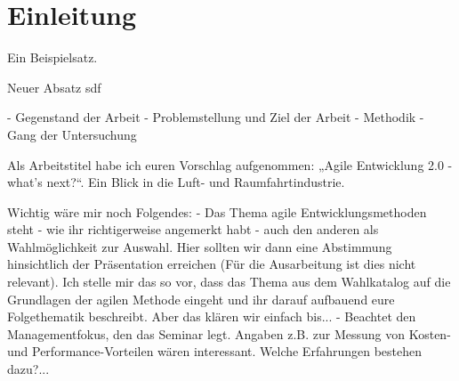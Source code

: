 \chapter{Einleitung}

Ein Beispielsatz. \parencite[Vgl.][S. 20]{Thompson:1984:RTT:358198.358210}

Neuer Absatz sdf


- Gegenstand der Arbeit
- Problemstellung und Ziel der Arbeit 
- Methodik
- Gang der Untersuchung

Als Arbeitstitel habe ich euren Vorschlag aufgenommen: „Agile Entwicklung 2.0 - what's next?“. Ein Blick in die Luft- und Raumfahrtindustrie.

Wichtig wäre mir noch Folgendes: 
- Das Thema agile Entwicklungsmethoden steht - wie ihr richtigerweise angemerkt habt - auch den anderen als Wahlmöglichkeit zur Auswahl. Hier sollten wir dann eine Abstimmung hinsichtlich der Präsentation erreichen (Für die Ausarbeitung ist dies nicht relevant). Ich stelle mir das so vor, dass das Thema aus dem Wahlkatalog auf die Grundlagen der agilen Methode eingeht und ihr darauf aufbauend eure Folgethematik beschreibt. Aber das klären wir einfach bis...
- Beachtet den Managementfokus, den das Seminar legt. Angaben z.B. zur Messung von Kosten- und Performance-Vorteilen wären interessant. Welche Erfahrungen bestehen dazu?...